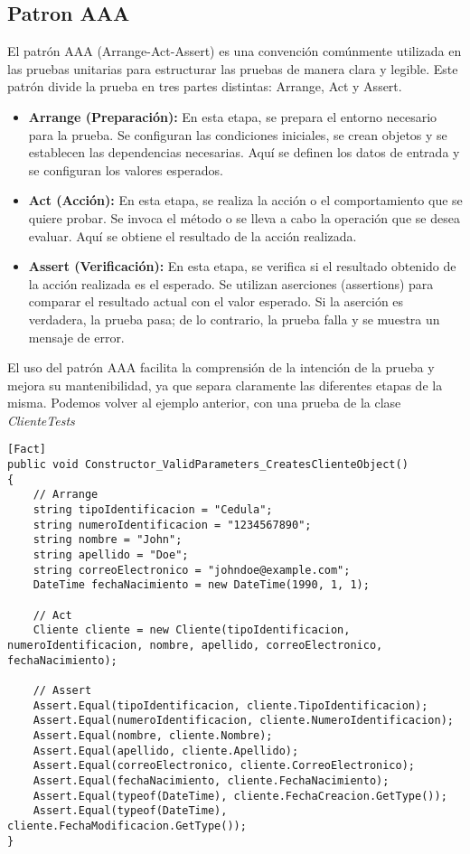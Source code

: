 \documentclass[executivepaper]{article}
\begin{document}
\subsection{Patron AAA}
El patrón AAA (Arrange-Act-Assert) es una convención comúnmente utilizada en las pruebas unitarias para estructurar las pruebas de manera clara y legible. Este patrón divide la prueba en tres partes distintas: Arrange, Act y Assert.

\begin{itemize}
    \item \textbf{Arrange (Preparación):} En esta etapa, se prepara el entorno necesario para la prueba. Se configuran las condiciones iniciales, se crean objetos y se establecen las dependencias necesarias. Aquí se definen los datos de entrada y se configuran los valores esperados.
    \item \textbf{Act (Acción):} En esta etapa, se realiza la acción o el comportamiento que se quiere probar. Se invoca el método o se lleva a cabo la operación que se desea evaluar. Aquí se obtiene el resultado de la acción realizada.
    \item \textbf{Assert (Verificación):} En esta etapa, se verifica si el resultado obtenido de la acción realizada es el esperado. Se utilizan aserciones (assertions) para comparar el resultado actual con el valor esperado. Si la aserción es verdadera, la prueba pasa; de lo contrario, la prueba falla y se muestra un mensaje de error.
\end{itemize}
El uso del patrón AAA facilita la comprensión de la intención de la prueba y mejora su mantenibilidad, ya que separa claramente las diferentes etapas de la misma. Podemos volver al ejemplo anterior, con una prueba de la clase \emph{ClienteTests}

\begin{lstlisting}
[Fact]
public void Constructor_ValidParameters_CreatesClienteObject()
{
    // Arrange
    string tipoIdentificacion = "Cedula";
    string numeroIdentificacion = "1234567890";
    string nombre = "John";
    string apellido = "Doe";
    string correoElectronico = "johndoe@example.com";
    DateTime fechaNacimiento = new DateTime(1990, 1, 1);

    // Act
    Cliente cliente = new Cliente(tipoIdentificacion, numeroIdentificacion, nombre, apellido, correoElectronico, fechaNacimiento);

    // Assert
    Assert.Equal(tipoIdentificacion, cliente.TipoIdentificacion);
    Assert.Equal(numeroIdentificacion, cliente.NumeroIdentificacion);
    Assert.Equal(nombre, cliente.Nombre);
    Assert.Equal(apellido, cliente.Apellido);
    Assert.Equal(correoElectronico, cliente.CorreoElectronico);
    Assert.Equal(fechaNacimiento, cliente.FechaNacimiento);
    Assert.Equal(typeof(DateTime), cliente.FechaCreacion.GetType());
    Assert.Equal(typeof(DateTime), cliente.FechaModificacion.GetType());
}
\end{lstlisting}
\end{document}
